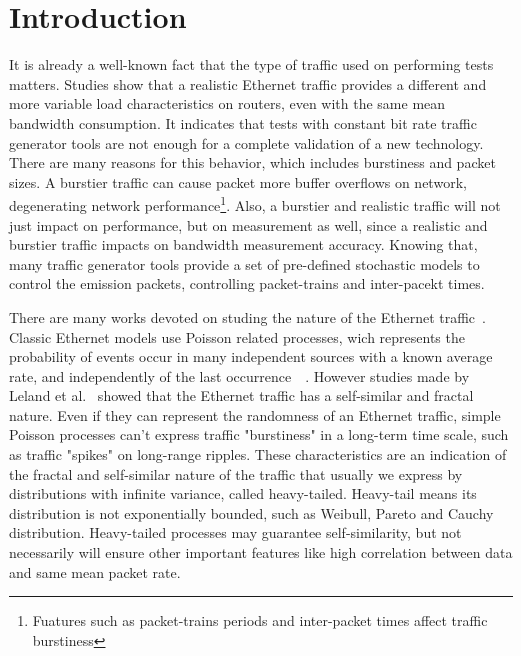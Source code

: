 \section{Introduction}\label{sec:introduction}


It is already a well-known fact that the type of traffic used on performing tests matters. Studies show that a realistic Ethernet traffic provides a different and more variable load characteristics on routers\cite{harpoon-validation}, even with the same mean bandwidth consumption. It indicates that tests with constant bit rate traffic generator tools are not enough for a complete validation of a new technology. There are many reasons for this behavior, which includes burstiness and packet sizes. A burstier traffic can cause packet more buffer overflows on network\cite{burstiness-queue-lenght}\cite{modelling-of-self-similar}\cite{empirical-interarrival-study}, degenerating network performance\footnote{Fuatures such as packet-trains periods and inter-packet times affect traffic burstiness}. Also, a burstier and realistic traffic will not just impact on performance, but on measurement as well, since a realistic and burstier traffic impacts on bandwidth measurement accuracy\cite{legotg-paper}\cite{background-traffic-matter}. Knowing that, many traffic generator tools\cite{ditg-paper} provide a set of pre-defined stochastic models to control the emission packets, controlling packet-trains and inter-pacekt times. 



There are many works devoted on studing the nature of the Ethernet traffic~\cite{selfsimilar-ethernet}\cite{analysis-self-similar}\cite{stochartic-selfsimilar}\cite{selfsimilar-highvariability}\cite{multi-player-online-game-self-similarity}. Classic Ethernet models use Poisson related processes, wich represents the probability of events occur in many independent sources with a known average rate, and independently of the last occurrence~\cite{selfsimilar-ethernet}~\cite{book-poisson}. However studies made by Leland et al.~\cite{selfsimilar-ethernet} showed that the Ethernet traffic has a self-similar and fractal nature. Even if they can represent the randomness of an Ethernet traffic, simple Poisson processes can't express traffic "burstiness" in a long-term time scale, such as traffic "spikes" on long-range ripples. These characteristics are an indication of the fractal and self-similar nature of the traffic that usually we express by distributions with infinite variance, called heavy-tailed. Heavy-tail means its distribution is not exponentially bounded\cite{sourcesonoff-paper}, such as Weibull, Pareto and Cauchy distribution.  Heavy-tailed processes may guarantee self-similarity, but not necessarily will ensure other important features like high correlation between data and same mean packet rate\cite{validate-trafficgen}. 


